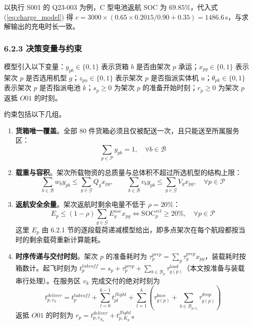 \documentclass[withoutpreface,bwprint]{format}
\begin{document}
以执行 S001 的 Q23-003 为例，C 型电池返航 SOC 为 $69.85\%$，代入式 (\ref{eq:charge_model}) 得 $c = 3000 \times (0.65 \times 0.2015/0.90 + 0.35) = 1486.6\,\text{s}$，与求解输出的充电时长一致。

\subsubsection{6.2.3 决策变量与约束}
模型引入以下变量：$y_{pb} \in \{0,1\}$ 表示货箱 $b$ 是否由架次 $p$ 承运；$x_{pg} \in \{0,1\}$ 表示架次 $p$ 是否选用机型 $g$；$z_{pu} \in \{0,1\}$ 表示架次 $p$ 是否指派实体机 $u$；$\theta_{pk} \in \{0,1\}$ 表示架次 $p$ 是否指派电池 $k$；$s_p \ge 0$ 为架次 $p$ 的准备开始时刻；$r_p \ge 0$ 为架次 $p$ 返抵 $O01$ 的时刻。

约束包括以下几组。

\begin{enumerate}[leftmargin=*]
    \item \textbf{货箱唯一覆盖}。全部 80 件货箱必须且仅被配送一次，且只能送至所属服务区：
    \begin{equation}
    \sum_{p \in \mathcal{P}} y_{pb} = 1, \quad \forall b \in \mathcal{B}
    \end{equation}

    \item \textbf{载重与容积}。架次所载物资的总质量与总体积不超过所选机型的结构上限：
    \begin{equation}
    \sum_{b \in \mathcal{B}} w_b y_{pb} \le \sum_{g \in \mathcal{G}} Q_g x_{pg}, \qquad \sum_{b \in \mathcal{B}} v_b y_{pb} \le \sum_{g \in \mathcal{G}} V_g x_{pg}, \quad \forall p \in \mathcal{P}
    \end{equation}

    \item \textbf{返航安全余量}。架次返航时剩余电量不低于 $\rho = 20\%$：
    \begin{equation}
    E_p \le (1 - \rho) \sum_{g \in \mathcal{G}} E_g^{use} x_{pg} \iff \text{SOC}_p^{ret} \ge 20\%, \quad \forall p \in \mathcal{P}
    \end{equation}
    这里 $E_p$ 由 6.2.1 节的逐段载荷递减模型给出，即多点架次在每个航段都按当时的剩余载荷重新计算能耗。

    \item \textbf{时序传递与交付时刻}。架次 $p$ 的准备耗时为 $\tau_p^{prep} = \sum_g \tau_g^{prep} x_{pg}$，装载耗时按箱数计。起飞时刻为 $t_p^{takeoff} = s_p + \tau_p^{prep} + \sum_{b \in \mathcal{B}_p} \tau_{g(p)}^{load}$（本文按准备与装载串行处理）。在服务区 $v_k$ 完成交付的绝对时刻为
    \begin{equation}
    t_{p, v_k}^{deliver} = t_p^{takeoff} + \sum_{l=0}^{k-1} t_{pl}^{flight} + \sum_{l=1}^k \left( \tau_{g(p)}^{base} + \sum_{b \in \mathcal{B}_{p, v_l}} \tau_{g(p)}^{drop} \right)
    \end{equation}
    返抵 $O01$ 的时刻为 $r_p = t_{p, v_{K_p}}^{deliver} + t_{p, K_p}^{flight}$。


\end{enumerate}
\end{document}
